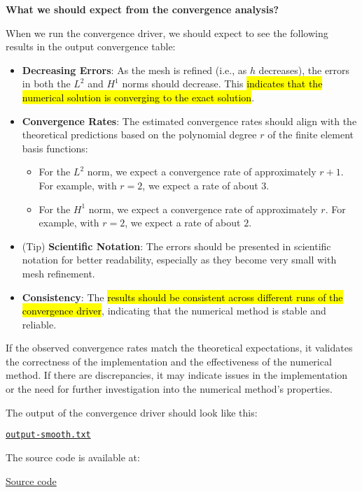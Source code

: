 \highspace
\begin{flushleft}
    \textcolor{Green3}{ \textbf{What we should expect from the convergence analysis?}}
\end{flushleft}
When we run the convergence driver, we should expect to see the following results in the output convergence table:
\begin{itemize}
    \item \textbf{Decreasing Errors}: As the mesh is refined (i.e., as $h$ decreases), the errors in both the $L^2$ and $H^1$ norms should decrease. This \hl{indicates that the numerical solution is converging to the exact solution}.
    \item \textbf{Convergence Rates}: The estimated convergence rates should align with the theoretical predictions based on the polynomial degree $r$ of the finite element basis functions:
    \begin{itemize}
        \item For the $L^2$ norm, we expect a convergence rate of approximately $r + 1$. For example, with $r = 2$, we expect a rate of about $3$.
        \item For the $H^1$ norm, we expect a convergence rate of approximately $r$. For example, with $r = 2$, we expect a rate of about $2$.
    \end{itemize}
    \item (Tip) \textbf{Scientific Notation}: The errors should be presented in scientific notation for better readability, especially as they become very small with mesh refinement.
    \item \textbf{Consistency}: The \hl{results should be consistent across different runs of the convergence driver}, indicating that the numerical method is stable and reliable.
\end{itemize}
If the observed convergence rates match the theoretical expectations, it validates the correctness of the implementation and the effectiveness of the numerical method. If there are discrepancies, it may indicate issues in the implementation or the need for further investigation into the numerical method's properties.

\highspace
The output of the convergence driver should look like this: 
\begin{center}
    \href{https://gist.github.com/AndreVale69/08f1b087ab991b1bc70fdd99b77f02dd#file-output-smooth-txt}{\texttt{output-smooth.txt}}
    \hspace{1em}
\end{center}

\noindent
The source code is available at:
\begin{center}
    \href{https://gist.github.com/AndreVale69/08f1b087ab991b1bc70fdd99b77f02dd}{Source code}
    \hspace{1em}
\end{center}